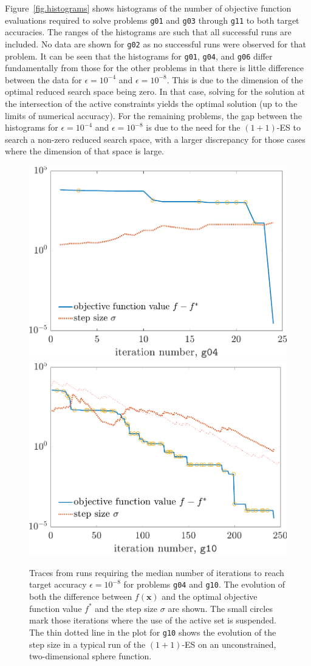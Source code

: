 \documentclass[oribibl]{llncs}
\newcommand{\x}{\ensuremath{\mathbf{x}}}
\begin{document}
Figure~\ref{fig.histograms} shows histograms of the number of objective function evaluations required to solve problems \texttt{g01} and \texttt{g03} through \texttt{g11} to both target accuracies. The ranges of the histograms are such that all successful runs are included.  No data are shown for \texttt{g02} as no successful runs were observed for that problem. It can be seen that the histograms for \texttt{g01}, \texttt{g04}, and \texttt{g06} differ fundamentally from those for the other problems in that there is little difference between the data for $\epsilon=10^{-4}$ and $\epsilon=10^{-8}$. This is due to the dimension of the optimal reduced search space being zero. In that case, solving for the solution at the intersection of the active constraints yields the optimal solution (up to the limits of numerical accuracy). For the remaining problems, the gap between the histograms for $\epsilon=10^{-4}$ and $\epsilon=10^{-8}$ is due to the need for the $(1+1)$-ES to search a non-zero reduced search space, with a larger discrepancy for those cases where the dimension of that space is large.
  
\begin{figure}
  \begin{minipage}{\linewidth}
    \includegraphics[width=.48\linewidth]{figures/medianRun04}
    \hfill
    \includegraphics[width=.48\linewidth]{figures/medianRun10}
  \end{minipage}
  \caption{\label{fig.sampleruns}Traces from runs requiring the median number
    of iterations to reach target accuracy $\epsilon=10^{-8}$ for problems
    \texttt{g04} and \texttt{g10}. The evolution of both the difference
    between $f(\x)$ and the optimal objective function value $f^*$ and the
    step size $\sigma$ are shown. The small circles mark those iterations
    where the use of the active set is suspended. The thin dotted line in the
    plot for \texttt{g10} shows the evolution of the step size in a typical
    run of the $(1+1)$-ES on an unconstrained, two-dimensional sphere
    function.}
\end{figure}
\end{document}
